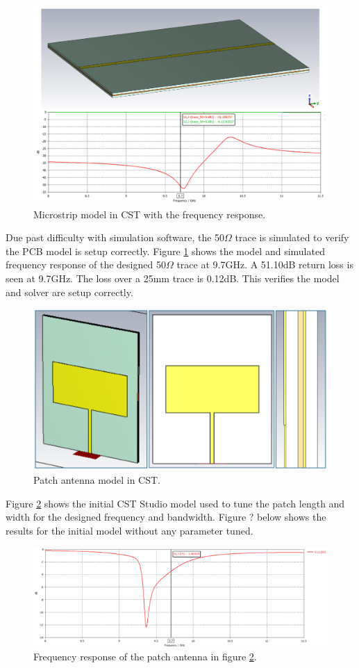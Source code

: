     \begin{figure}[H]
    \centering
    \includegraphics[width=0.9\linewidth]{Figures/chp3_CST_microstrip_combined.png}
    \caption{Microstrip model in CST with the frequency response.}
    \label{fig:chp3_CST_microstrip_combined}
    \end{figure}

Due past difficulty with simulation software, the 50$\Omega$ trace is simulated to verify the PCB model is setup correctly. Figure \ref{fig:chp3_CST_microstrip_combined} shows the model and simulated frequency response of the designed 50$\Omega$ trace at 9.7GHz. A 51.10dB return loss is seen at 9.7GHz. The loss over a 25mm trace is 0.12dB. This verifies the model and solver are setup correctly.

    \begin{figure}[H]
    \centering
    \includegraphics[width=0.5\linewidth]{Figures/chp3_CPW_patch.png}
    \caption{Patch antenna model in CST.}
    \label{fig:chp3_CPW_patch}
    \end{figure}

Figure \ref{fig:chp3_CPW_patch} shows the initial CST Studio model used to tune the patch length and width for the designed frequency and bandwidth. Figure ? below shows the results for the initial model without any parameter tuned. 

    \begin{figure}[H]
    \centering
    \includegraphics[width=0.9\linewidth]{Figures/chp3_CPW_patch_results.png}
    \caption{Frequency response of the patch antenna in figure \ref{fig:chp3_CPW_patch}.}
    \label{fig:chp3_CPW_patch_results}
    \end{figure}


